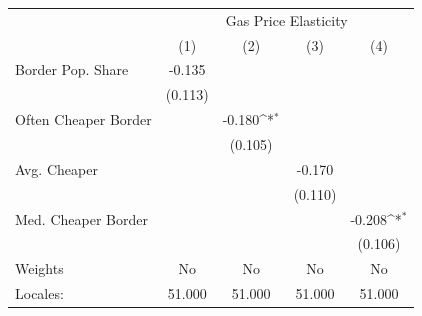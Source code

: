 {
\def\sym#1{\ifmmode^{#1}\else\(^{#1}\)\fi}
\begin{tabular}{l*{4}{c}}
\hline\hline
            &\multicolumn{4}{c}{Gas Price Elasticity}                                               \\
            &\multicolumn{1}{c}{(1)}         &\multicolumn{1}{c}{(2)}         &\multicolumn{1}{c}{(3)}         &\multicolumn{1}{c}{(4)}         \\
\hline
Border Pop. Share&      -0.135         &                     &                     &                     \\
            &     (0.113)         &                     &                     &                     \\
[1em]
Often Cheaper Border&                     &      -0.180\sym{*}  &                     &                     \\
            &                     &     (0.105)         &                     &                     \\
[1em]
Avg. Cheaper&                     &                     &      -0.170         &                     \\
            &                     &                     &     (0.110)         &                     \\
[1em]
Med. Cheaper Border&                     &                     &                     &      -0.208\sym{*}  \\
            &                     &                     &                     &     (0.106)         \\
\hline
Weights     &          No         &          No         &          No         &          No         \\
Locales:    &      51.000         &      51.000         &      51.000         &      51.000         \\
\hline\hline
\end{tabular}
}
